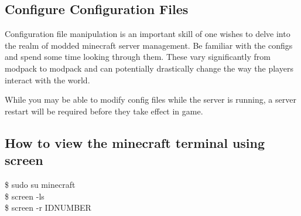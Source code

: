\documentclass{report}
\begin{document}
\subsection{Configure Configuration Files}
Configuration file manipulation is an important skill of one wishes to delve into the realm of modded minecraft server management. Be familiar with the configs and spend some time looking through them. These vary significantly from modpack to modpack and can potentially drastically change the way the players interact with the world.\\

\begin{mdframed}[style=Note]
While you may be able to modify config files while the server is running, a server restart will be required before they take effect in game.
\end{mdframed}

\pagebreak

\subsection{How to view the minecraft terminal using screen}
\begin{mdframed}[style=Code]
	\$ sudo su minecraft\\
	\$ screen -ls\\
	\$ screen -r IDNUMBER
\end{mdframed}
\end{document}
